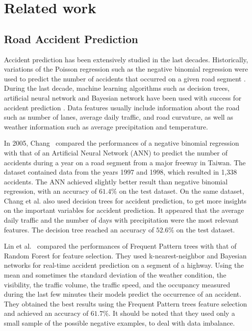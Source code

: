 \documentclass[conference]{IEEEtran}
\begin{document}
\section{Related work}
\subsection{Road Accident Prediction}
Accident prediction has been extensively studied in the last decades.
Historically, variations of the Poisson regression such as the negative
binomial regression were used to predict the number of accidents that
occurred on a given road segment \cite{Milton1998}. During the last decade,
machine learning algorithms such as decision trees, artificial neural network
and Bayesian network have been used with success for accident prediction
\cite{Chang2005, Chang2005b, Lin2015, Theofilatos2017}.
Data features usually include information about the road such as number of
lanes, average daily traffic, and road curvature, as well as weather
information such as average precipitation and temperature. 

In 2005,
Chang~\cite{Chang2005} compared the performances of a negative binomial
regression with that of an Artificial Neural Network (ANN) to predict the number
of accidents during a year on a road segment from a major freeway in
Taiwan. The dataset contained data from the years 1997 and 1998, which
resulted in 1,338 accidents. The ANN achieved slightly better result than negative 
binomial regression, with
an accuracy of $61.4\%$ on the test dataset. On the same dataset, Chang et
al.\cite{Chang2005b} also used decision trees for accident prediction,
 to get more insights on the important variables for accident
prediction. It appeared that the average daily traffic and the number of
days with precipitation were the most relevant features. The decision tree
reached an accuracy of $52.6\%$ on the test dataset. 

Lin et
al.~\cite{Lin2015} compared the performances of Frequent Pattern trees\cite{Han2004} with
that of Random Forest for feature selection. They used k-nearest-neighbor
and Bayesian networks for real-time accident prediction on a segment of
a highway. Using the mean and sometimes the standard deviation of the weather condition, the visibility, the traffic volume, the traffic speed, and the occupancy measured during the last few minutes their models predict the occurrence of an accident. They obtained
the best results using the Frequent Pattern trees feature selection and achieved
an accuracy of $61.7\%$. It should be noted that they used only a small sample of the
possible negative examples, to deal with data imbalance. 
\end{document}
